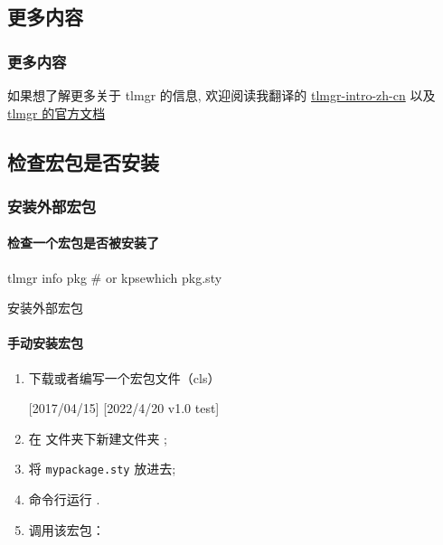 \subsection{更多内容}

\begin{frame}
  \frametitle{更多内容}
  如果想了解更多关于 tlmgr 的信息, 欢迎阅读我翻译的 \href{http://mirrors.ctan.org/info/tlmgr-intro-zh-cn/tlmgr-intro-zh-cn.pdf}{tlmgr-intro-zh-cn} 以及 \href{https://www.tug.org/texlive/doc/tlmgr.html}{tlmgr 的官方文档}
\end{frame}




\subsection{检查宏包是否安装}

\begin{frame}[fragile]
  \frametitle{安装外部宏包}
  \framesubtitle{检查一个宏包是否被安装了}
\begin{cmdcode}
tlmgr info pkg
# or 
kpsewhich pkg.sty
\end{cmdcode}
\end{frame}

\begin{frame}[fragile]{安装外部宏包}
\framesubtitle{手动安装宏包}

\begin{enumerate}
  \item 下载或者编写一个宏包文件（cls） 
    \begin{latexcode}
    [2017/04/15]
    [2022/4/20 v1.0 test]
    \newcommand{\mycmd}{Hello \LaTeX}  
    \end{latexcode}
  \item 在  文件夹下新建文件夹 ;
  \item 将 \texttt{mypackage.sty} 放进去;
  \item 命令行运行 .
  \item 调用该宏包：
\end{enumerate}
\end{frame}


